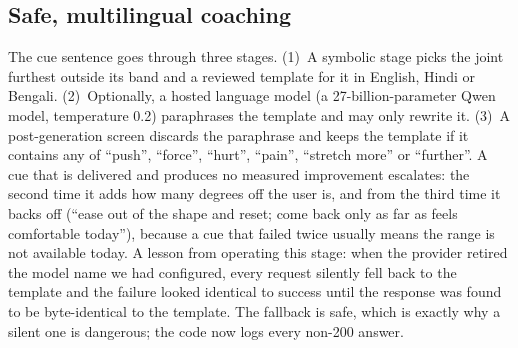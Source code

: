 \subsection{Safe, multilingual coaching}\label{sec:safety}
The cue sentence goes through three stages. (1)~A symbolic stage picks the joint furthest outside its band and a reviewed template for it in English, Hindi or Bengali. (2)~Optionally, a hosted language model (a 27-billion-parameter Qwen model, temperature 0.2) paraphrases the template and may only rewrite it. (3)~A post-generation screen discards the paraphrase and keeps the template if it contains any of ``push'', ``force'', ``hurt'', ``pain'', ``stretch more'' or ``further''. A cue that is delivered and produces no measured improvement escalates: the second time it adds how many degrees off the user is, and from the third time it backs off (``ease out of the shape and reset; come back only as far as feels comfortable today''), because a cue that failed twice usually means the range is not available today. A lesson from operating this stage: when the provider retired the model name we had configured, every request silently fell back to the template and the failure looked identical to success until the response was found to be byte-identical to the template. The fallback is safe, which is exactly why a silent one is dangerous; the code now logs every non-200 answer.
